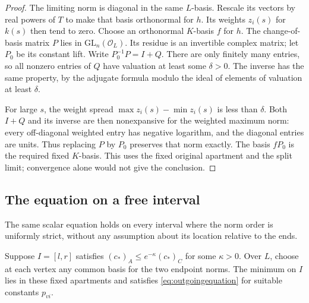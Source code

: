 \begin{proof}
The limiting norm is diagonal in the same $L$-basis. Rescale its
vectors by real powers of $T$ to make that basis orthonormal for
$h$. Its weights $z_i(s)$ for $k(s)$ then tend to zero. Choose an
orthonormal $K$-basis $f$ for $h$. The change-of-basis matrix
$P$ lies in $\mathrm{GL}_n(\mathcal O_L)$. Its residue is an
invertible complex matrix; let $P_0$ be its constant lift. Write
$P_0^{-1}P=I+Q$. There are only finitely many entries, so all nonzero
entries of $Q$ have valuation at least some $\delta>0$.
The inverse has the same property, by the adjugate formula modulo
the ideal of elements of valuation at least $\delta$.

For large $s$, the weight spread $\max z_i(s)-\min z_i(s)$ is
less than $\delta$. Both $I+Q$ and its inverse are then
nonexpansive for the weighted maximum norm: every off-diagonal
weighted entry has negative logarithm, and the diagonal entries
are units. Thus replacing $P$ by $P_0$ preserves that norm exactly.
The basis $fP_0$ is the required fixed $K$-basis. This uses the
fixed original apartment and the split limit; convergence alone
would not give the conclusion.
\end{proof}

\subsection{The equation on a free interval}
The same scalar equation holds on every interval where the norm
order is uniformly strict, without any assumption about its
location relative to the ends.

\begin{proposition}\label{prop:freeinterval}
Suppose $I=[l,r]$ satisfies $(c_*)_A\le e^{-\kappa}(c_*)_C$
for some $\kappa>0$. Over $L$, choose at each vertex any common
basis for the two endpoint norms. The minimum on $I$ lies in
these fixed apartments and satisfies \eqref{eq:outgoingequation}
for suitable constants $p_{vi}$.
\end{proposition}

